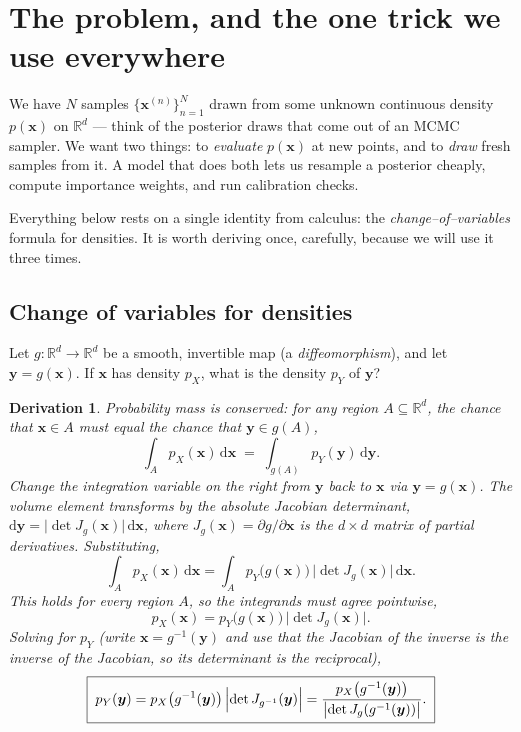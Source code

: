 \documentclass[11pt]{article}
\newcommand{\R}{\mathbb{R}}
\newcommand{\x}{\bm{x}}
\newcommand{\yy}{\bm{y}}
\newtheorem*{deriv}{Derivation}
\theoremstyle{remark}
\begin{document}
\tableofcontents

\section{The problem, and the one trick we use everywhere}
\label{sec:problem}

We have $N$ samples $\{\x^{(n)}\}_{n=1}^{N}$ drawn from some unknown continuous
density $p(\x)$ on $\R^{d}$ --- think of the posterior draws that come out of an
MCMC sampler. We want two things: to \emph{evaluate} $p(\x)$ at new points, and
to \emph{draw} fresh samples from it. A model that does both lets us resample a
posterior cheaply, compute importance weights, and run calibration checks.

Everything below rests on a single identity from calculus: the
\emph{change--of--variables} formula for densities. It is worth deriving once,
carefully, because we will use it three times.

\subsection{Change of variables for densities}

Let $g:\R^{d}\to\R^{d}$ be a smooth, invertible map (a \emph{diffeomorphism}),
and let $\yy=g(\x)$. If $\x$ has density $p_X$, what is the density $p_Y$ of
$\yy$?

\begin{deriv}
Probability mass is conserved: for any region $A\subseteq\R^{d}$, the chance that
$\x\in A$ must equal the chance that $\yy\in g(A)$,
\begin{equation}
\int_{A} p_X(\x)\,\mathrm{d}\x \;=\; \int_{g(A)} p_Y(\yy)\,\mathrm{d}\yy .
\end{equation}
Change the integration variable on the right from $\yy$ back to $\x$ via
$\yy=g(\x)$. The volume element transforms by the absolute Jacobian determinant,
$\mathrm{d}\yy=\bigl|\det J_g(\x)\bigr|\,\mathrm{d}\x$, where
$J_g(\x)=\partial g/\partial\x$ is the $d\times d$ matrix of partial derivatives.
Substituting,
\begin{equation}
\int_{A} p_X(\x)\,\mathrm{d}\x
= \int_{A} p_Y\bigl(g(\x)\bigr)\,\bigl|\det J_g(\x)\bigr|\,\mathrm{d}\x .
\end{equation}
This holds for \emph{every} region $A$, so the integrands must agree pointwise,
\begin{equation}
\label{eq:cov-forward}
p_X(\x) = p_Y\bigl(g(\x)\bigr)\,\bigl|\det J_g(\x)\bigr| .
\end{equation}
Solving for $p_Y$ (write $\x=g^{-1}(\yy)$ and use that the Jacobian of the
inverse is the inverse of the Jacobian, so its determinant is the reciprocal),
\begin{equation}
\label{eq:cov}
\boxed{\;
p_Y(\yy) = p_X\bigl(g^{-1}(\yy)\bigr)\,
\Bigl|\det J_{g^{-1}}(\yy)\Bigr|
= \frac{p_X\bigl(g^{-1}(\yy)\bigr)}{\bigl|\det J_g(g^{-1}(\yy))\bigr|}. \;}
\end{equation}
\end{deriv}
\end{document}
